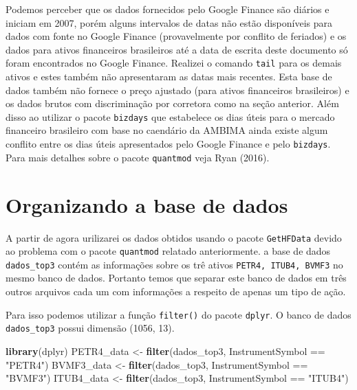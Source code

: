 \documentclass[]{article}
\newenvironment{Shaded}{\begin{snugshade}}{\end{snugshade}}
\newcommand{\KeywordTok}[1]{\textcolor[rgb]{0.13,0.29,0.53}{\textbf{{#1}}}}
\newcommand{\StringTok}[1]{\textcolor[rgb]{0.31,0.60,0.02}{{#1}}}
\newcommand{\NormalTok}[1]{{#1}}
\begin{document}
Podemos perceber que os dados fornecidos pelo Google Finance são diários
e iniciam em 2007, porém alguns intervalos de datas não estão
disponíveis para dados com fonte no Google Finance (provavelmente por
conflito de feriados) e os dados para ativos financeiros brasileiros até
a data de escrita deste documento só foram encontrados no Google
Finance. Realizei o comando \texttt{tail} para os demais ativos e estes
também não apresentaram as datas mais recentes. Esta base de dados
também não fornece o preço ajustado (para ativos financeiros
brasileiros) e os dados brutos com discriminação por corretora como na
seção anterior. Além disso ao utilizar o pacote \texttt{bizdays} que
estabelece os dias úteis para o mercado financeiro brasileiro com base
no caendário da AMBIMA ainda existe algum conflito entre os dias úteis
apresentados pelo Google Finance e pelo \texttt{bizdays}. Para mais
detalhes sobre o pacote \texttt{quantmod} veja Ryan (2016).

\section{Organizando a base de dados}\label{organizando-a-base-de-dados}

A partir de agora urilizarei os dados obtidos usando o pacote
\texttt{GetHFData} devido ao problema com o pacote \texttt{quantmod}
relatado anteriormente. a base de dados \texttt{dados\_top3} contém as
informações sobre os trê ativos \texttt{PETR4,\ ITUB4,\ BVMF3} no mesmo
banco de dados. Portanto temos que separar este banco de dados em três
outros arquivos cada um com informações a respeito de apenas um tipo de
ação.

Para isso podemos utilizar a função \texttt{filter()} do pacote
\texttt{dplyr}. O banco de dados \texttt{dados\_top3} possui dimensão
(1056, 13).

\begin{Shaded}
\begin{Highlighting}[]
\KeywordTok{library}\NormalTok{(dplyr)}
\NormalTok{PETR4_data <-}\StringTok{ }\KeywordTok{filter}\NormalTok{(dados_top3, InstrumentSymbol ==}\StringTok{ "PETR4"}\NormalTok{)}
\NormalTok{BVMF3_data <-}\StringTok{ }\KeywordTok{filter}\NormalTok{(dados_top3, InstrumentSymbol ==}\StringTok{ "BVMF3"}\NormalTok{)}
\NormalTok{ITUB4_data <-}\StringTok{ }\KeywordTok{filter}\NormalTok{(dados_top3, InstrumentSymbol ==}\StringTok{ "ITUB4"}\NormalTok{)}
\end{Highlighting}
\end{Shaded}
\end{document}
